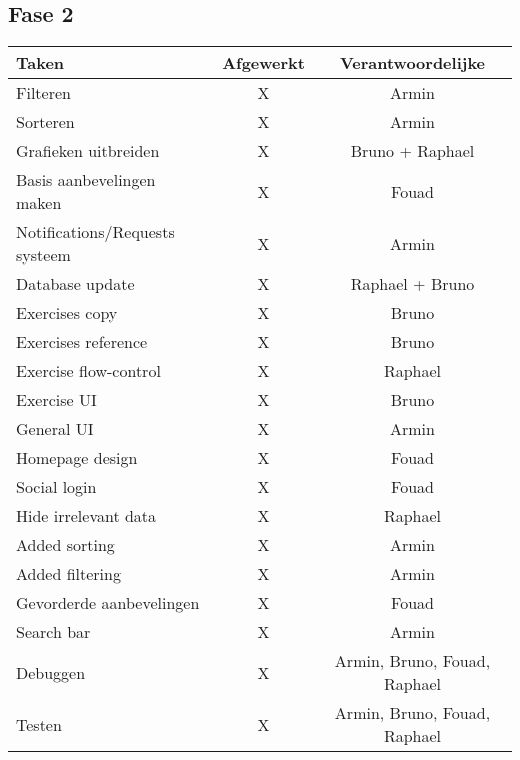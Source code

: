 \subsection{Fase 2}
\begin{tabular}{| l | c | c |}
    \hline
    Taken   &   Afgewerkt   &   Verantwoordelijke \\
    \hline \hline
    Filteren                &   X   &   Armin   \\
    Sorteren                &   X   &   Armin   \\
    Grafieken uitbreiden    &   X   &   Bruno + Raphael \\
    Basis aanbevelingen maken &   X   & Fouad \\
    Notifications/Requests systeem &  X  & Armin \\
    Database update         &   X   &   Raphael + Bruno \\
    Exercises copy          &   X   &   Bruno   \\
    Exercises reference     &   X   &   Bruno   \\
    Exercise flow-control   &   X   &   Raphael \\
    Exercise UI             &   X   &   Bruno   \\
    General UI              &   X   &   Armin   \\
    Homepage design         &   X   &   Fouad   \\
    Social login            &   X   &   Fouad   \\
    Hide irrelevant data    &   X   &   Raphael \\
    Added sorting           &   X   &   Armin   \\
    Added filtering         &   X   &   Armin   \\
    Gevorderde aanbevelingen    &   X   &   Fouad   \\
    Search bar              &   X   &   Armin   \\
    \hline
    Debuggen               &   X   &   Armin, Bruno, Fouad, Raphael    \\
    Testen                 &   X   &   Armin, Bruno, Fouad, Raphael    \\
    \hline
\end{tabular}
